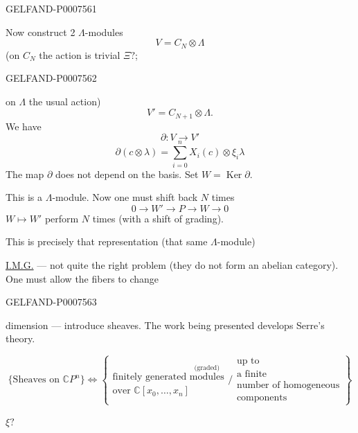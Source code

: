 \begin{GelfandAdjacentEvidence}{GELFAND-P000756}{1}

Now construct 2 \(\Lambda\)-modules
\begin{equation*}
V=C_N\otimes\Lambda
\tag{18}
\end{equation*}
(on \(C_N\) the action is trivial \(\Xi?\);
\end{GelfandAdjacentEvidence}
\begin{GelfandAdjacentEvidence}{GELFAND-P000756}{2}

on \(\Lambda\) the usual action)
\begin{equation*}
V'=C_{N+1}\otimes\Lambda.
\tag{\(18'\)}
\end{equation*}
We have
\begin{equation*}
\partial:V\longrightarrow V'
\tag{19}
\end{equation*}
\begin{equation*}
\partial(c\otimes\lambda)=\sum_{i=0}^n X_i(c)\otimes\xi_i\lambda
\tag{20}
\end{equation*}
The map \(\partial\) does not depend on the basis.
Set \(W=\operatorname{Ker}\partial\).

This is a \(\Lambda\)-module. Now one must shift back \(N\) times
\[
0\longrightarrow W'\longrightarrow P\longrightarrow W\longrightarrow0
\]
\(W\longmapsto W'\) perform \(N\) times
(with a shift of grading).

This is precisely that representation (that same \(\Lambda\)-module)

\underline{I.M.G.}\quad{}
--- not quite the right problem (they do not form an abelian category).
One must allow the fibers to change
\end{GelfandAdjacentEvidence}
\begin{GelfandAdjacentEvidence}{GELFAND-P000756}{3}

dimension --- introduce sheaves.
The work being presented develops Serre's theory.

\[
\{\text{Sheaves on }\mathbb CP^n\}\Leftrightarrow
\left\{
\begin{array}{l}
\text{finitely generated }\overset{\text{(graded)}}{\text{modules}}\\
\text{over }\mathbb C[x_0,\ldots,x_n]
\end{array}
\Big/
\begin{array}{l}
\text{up to}\\
\text{a finite}\\
\text{number of homogeneous}\\
\text{components}
\end{array}
\right\}
\]

\(\xi?\)
\end{GelfandAdjacentEvidence}
